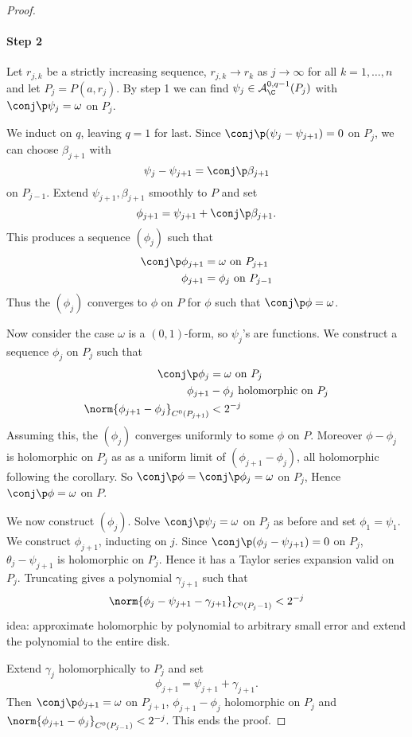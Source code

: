 \documentclass[a4paper]{article}
\begin{document}
\begin{proof}
  \paragraph{Step 2}
  Let \(r_{j, k}\) be a strictly increasing sequence, \(r_{j, k} \to r_k\) as \(j \to \infty\) for all \(k = 1, \dots, n\) and let \(P_j = P(a, r_j)\). By step 1 we can find \(\psi_j \in \mathcal A_\C^{0, q - 1}(P_j)\) with \(\conj \p \psi_j = \omega\) on \(P_j\).

  We induct on \(q\), leaving \(q = 1\) for last. Since \(\conj \p(\psi_j - \psi_{j + 1}) = 0\) on \(P_j\), we can choose \(\beta_{j + 1}\) with
  \[
    \psi_j - \psi_{j + 1} = \conj \p \beta_{j + 1}
  \]
  on \(P_{j - 1}\). Extend \(\psi_{j + 1}, \beta_{j + 1}\) smoothly to \(P\) and set
  \[
    \phi_{j + 1} = \psi_{j + 1} + \conj \p \beta_{j + 1}.
  \]
  This produces a sequence \((\phi_j)\) such that
  \begin{align*}
    \conj \p \phi_{j + 1} &= \omega \text{ on } P_{j + 1} \\
    \phi_{j + 1} &= \phi_j \text{ on } P_{j - 1}
  \end{align*}
  Thus the \((\phi_j)\) converges to \(\phi\) on \(P\) for \(\phi\) such that \(\conj \p \phi = \omega\).

  Now consider the case \(\omega\) is a \((0, 1)\)-form, so \(\psi_j\)'s are functions. We construct a sequence \(\phi_j\) on \(P_j\) such that
  \begin{align*}
    \conj \p \phi_j &= \omega \text{ on } P_j \\
    \phi_{j + 1} &- \phi_j \text{ holomorphic on } P_j \\
    \norm{\phi_{j + 1} - \phi_j}_{C^0(P_{j + 1})} &< 2^{-j}
  \end{align*}
  Assuming this, the \((\phi_j)\) converges uniformly to some \(\phi\) on \(P\). Moreover \(\phi - \phi_j\) is holomorphic on \(P_j\) as as a uniform limit of \((\phi_{j + 1} - \phi_j)\), all holomorphic following the corollary. So \(\conj \p \phi = \conj \p \phi_j = \omega\) on \(P_j\), Hence \(\conj \p \phi = \omega\) on \(P\).

  We now construct \((\phi_j)\). Solve \(\conj \p \psi_j = \omega\) on \(P_j\) as before and set \(\phi_1 = \psi_1\). We construct \(\phi_{j + 1}\), inducting on \(j\). Since \(\conj \p(\phi_j - \psi_{j + 1}) = 0\) on \(P_j\), \(\theta_j - \psi_{j + 1}\) is holomorphic on \(P_j\). Hence it has a Taylor series expansion valid on \(P_j\). Truncating gives a polynomial \(\gamma_{j + 1}\) such that
  \[
    \norm{\phi_j - \psi_{j + 1} - \gamma_{j + 1}}_{C^0(P_j - 1)} < 2^{-j}
  \]
  idea: approximate holomorphic by polynomial to arbitrary small error and extend the polynomial to the entire disk.

  Extend \(\gamma_j\) holomorphically to \(P_j\) and set
  \[
    \phi_{j + 1} = \psi_{j + 1} + \gamma_{j + 1}.
  \]
  Then \(\conj \p \phi_{j + 1} = \omega\) on \(P_{j + 1}\), \(\phi_{j + 1} - \phi_j\) holomorphic on \(P_j\) and \(\norm{\phi_{j + 1} - \phi_j}_{C^0(P_{j - 1})} < 2^{-j}\). This ends the proof.
\end{proof}
\end{document}

